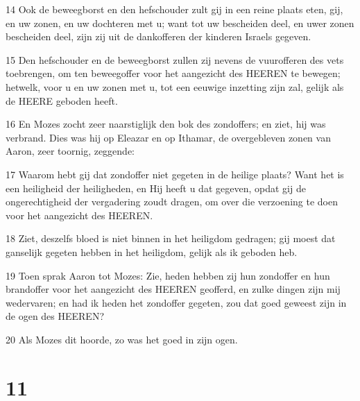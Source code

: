 \par 14 Ook de beweegborst en den hefschouder zult gij in een reine plaats eten, gij, en uw zonen, en uw dochteren met u; want tot uw bescheiden deel, en uwer zonen bescheiden deel, zijn zij uit de dankofferen der kinderen Israels gegeven.
\par 15 Den hefschouder en de beweegborst zullen zij nevens de vuurofferen des vets toebrengen, om ten beweegoffer voor het aangezicht des HEEREN te bewegen; hetwelk, voor u en uw zonen met u, tot een eeuwige inzetting zijn zal, gelijk als de HEERE geboden heeft.
\par 16 En Mozes zocht zeer naarstiglijk den bok des zondoffers; en ziet, hij was verbrand. Dies was hij op Eleazar en op Ithamar, de overgebleven zonen van Aaron, zeer toornig, zeggende:
\par 17 Waarom hebt gij dat zondoffer niet gegeten in de heilige plaats? Want het is een heiligheid der heiligheden, en Hij heeft u dat gegeven, opdat gij de ongerechtigheid der vergadering zoudt dragen, om over die verzoening te doen voor het aangezicht des HEEREN.
\par 18 Ziet, deszelfs bloed is niet binnen in het heiligdom gedragen; gij moest dat ganselijk gegeten hebben in het heiligdom, gelijk als ik geboden heb.
\par 19 Toen sprak Aaron tot Mozes: Zie, heden hebben zij hun zondoffer en hun brandoffer voor het aangezicht des HEEREN geofferd, en zulke dingen zijn mij wedervaren; en had ik heden het zondoffer gegeten, zou dat goed geweest zijn in de ogen des HEEREN?
\par 20 Als Mozes dit hoorde, zo was het goed in zijn ogen.

\chapter{11}

